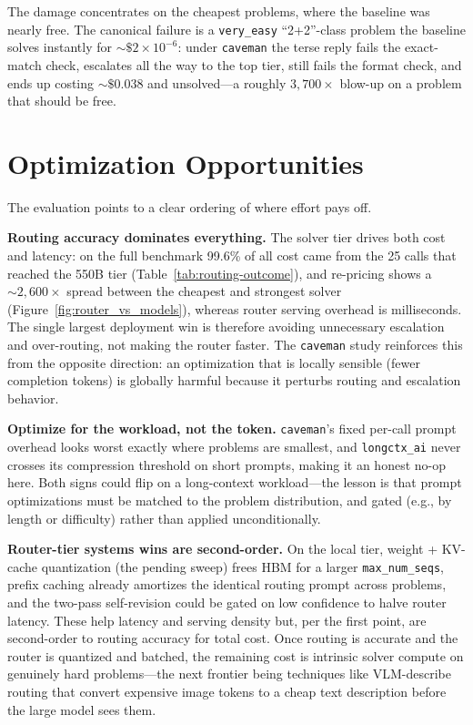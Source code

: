 \documentclass[10pt]{article}
\begin{document}
The damage concentrates on the cheapest problems, where the baseline was nearly free.
The canonical failure is a \texttt{very\_easy} ``2+2''-class problem the baseline
solves instantly for $\sim\!\$2\!\times\!10^{-6}$: under \texttt{caveman} the terse
reply fails the exact-match check, escalates all the way to the top tier, still fails
the format check, and ends up costing $\sim\!\$0.038$ and unsolved---a roughly
$3{,}700\times$ blow-up on a problem that should be free.

\section{Optimization Opportunities}
\label{sec:optimization}
The evaluation points to a clear ordering of where effort pays off.

\textbf{Routing accuracy dominates everything.}
The solver tier drives both cost and latency: on the full benchmark 99.6\% of all cost
came from the 25 calls that reached the 550B tier (Table~\ref{tab:routing-outcome}),
and re-pricing shows a $\sim\!2{,}600\times$ spread between the cheapest and strongest
solver (Figure~\ref{fig:router_vs_models}), whereas router serving overhead is
milliseconds. The single largest deployment win is therefore avoiding unnecessary
escalation and over-routing, not making the router faster. The \texttt{caveman} study
reinforces this from the opposite direction: an optimization that is locally sensible
(fewer completion tokens) is globally harmful because it perturbs routing and escalation
behavior.

\textbf{Optimize for the workload, not the token.}
\texttt{caveman}'s fixed per-call prompt overhead looks worst exactly where problems
are smallest, and \texttt{longctx\_ai} never crosses its compression threshold on
short prompts, making it an honest no-op here. Both signs could flip on a long-context
workload---the lesson is that prompt optimizations must be matched to the problem
distribution, and gated (e.g., by length or difficulty) rather than applied
unconditionally.

\textbf{Router-tier systems wins are second-order.}
On the local tier, weight + KV-cache quantization (the pending sweep) frees HBM for a
larger \texttt{max\_num\_seqs}, prefix caching already amortizes the identical routing
prompt across problems, and the two-pass self-revision could be gated on low confidence
to halve router latency. These help latency and serving density but, per the first
point, are second-order to routing accuracy for total cost. Once routing is accurate and
the router is quantized and batched, the remaining cost is intrinsic solver compute on
genuinely hard problems---the next frontier being techniques like VLM-describe routing
that convert expensive image tokens to a cheap text description before the large model
sees them.
\end{document}
